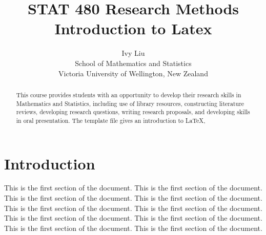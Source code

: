 \documentclass[12pt]{article}
\title{STAT 480 Research Methods\\ Introduction to Latex}
\author{Ivy Liu\\
School of Mathematics and Statistics\\ Victoria University of Wellington, New Zealand}
\begin{document}
\maketitle

\begin{abstract}
  This course provides students with an opportunity to develop their
  research skills in Mathematics and Statistics, including use of
  library resources, constructing literature reviews, developing
  research questions, writing research proposals, and developing
  skills in oral presentation. The template file gives an introduction
  to LaTeX,
\end{abstract}


\tableofcontents


\setlength{\baselineskip}{0.25in} %





\newpage  %
\section{Introduction}

\label{s.intro}


This is the first section of the document. This is the first section of the document. This is the first section of the document.  This is the first section of the document. This is the first section of the document. This is the first section of the document. This is the first section of the document. This is the first section of the document. This is the first section of the document. This is the first section of the document.
\end{document}
